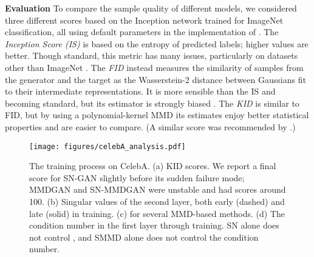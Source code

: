 \documentclass{article}
\begin{document}
\textbf{Evaluation}
To compare the sample quality of different models,
we considered three different scores
based on the Inception network \parencite{inception} trained for ImageNet classification,
all using default parameters in the implementation of \cite{Binkowski:2018}.
The \emph{Inception Score (IS)} \parencite{improved-gans}
is based on the entropy of predicted labels;
higher values are better.
Though standard, this metric has many issues,
particularly on datasets other than ImageNet \parencite{note-on-inception,fid,Binkowski:2018}.
The \emph{FID} \parencite{fid}
instead measures the similarity of samples from the generator and the target
as the Wasserstein-2 distance between Gaussians fit to
their intermediate representations.
It is more sensible than the IS and becoming standard,
but its estimator is strongly biased \parencite{Binkowski:2018}.
The \emph{KID} \parencite{Binkowski:2018}
is similar to FID,
but by using a polynomial-kernel MMD its estimates enjoy better statistical properties
and are easier to compare.
(A similar score was recommended by \cite{empirical-evaluation}.)





 \begin{figure}[p]
  \centering
    \texttt{[image: figures/celebA\_analysis.pdf]}
    \caption{The training process on CelebA.
      (a) KID scores. We report a final score for SN-GAN slightly before its sudden failure mode;
          MMDGAN and SN-MMDGAN were unstable and had scores around 100.
      (b) Singular values of the second layer, both early (dashed) and late (solid) in training.
      (c)  for several MMD-based methods.
      (d) The condition number in the first layer through training.
      SN alone does not control ,
      and SMMD alone does not control the condition number.
    }
    \label{fig:celebA_scores_and_singular_values}
 \end{figure}
\end{document}
